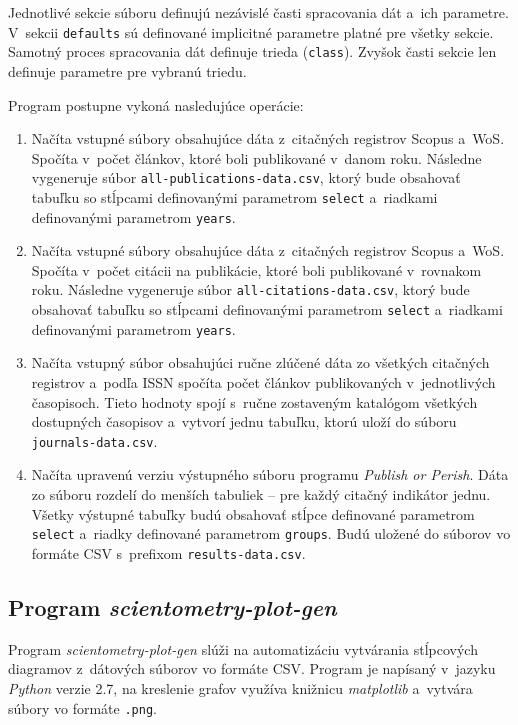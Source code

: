 Jednotlivé sekcie súboru definujú nezávislé časti spracovania dát a~ich
parametre.  V~sekcii \verb|defaults| sú definované implicitné parametre platné
pre všetky sekcie.  Samotný proces spracovania dát definuje trieda
(\verb|class|).  Zvyšok časti sekcie len definuje parametre pre vybranú triedu.

Program postupne vykoná nasledujúce operácie:

\begin{enumerate}
\item Načíta vstupné súbory obsahujúce dáta z~citačných registrov Scopus a~WoS.
  Spočíta v~počet článkov, ktoré boli publikované v~danom roku.  Následne
  vygeneruje súbor \verb|all-publications-data.csv|, ktorý bude obsahovať
  tabuľku so stĺpcami definovanými parametrom \verb|select| a~riadkami
  definovanými parametrom \verb|years|.
\item Načíta vstupné súbory obsahujúce dáta z~citačných registrov Scopus a~WoS.
  Spočíta v~počet citácii na publikácie, ktoré boli publikované v~rovnakom roku.
  Následne vygeneruje súbor \verb|all-citations-data.csv|, ktorý bude obsahovať
  tabuľku so stĺpcami definovanými parametrom \verb|select| a~riadkami
  definovanými parametrom \verb|years|.
\item Načíta vstupný súbor obsahujúci ručne zlúčené dáta zo všetkých citačných
  registrov a~podľa ISSN spočíta počet článkov publikovaných v~jednotlivých
  časopisoch.  Tieto hodnoty spojí s~ručne zostaveným katalógom všetkých
  dostupných časopisov a~vytvorí jednu tabuľku, ktorú uloží do súboru
  \verb|journals-data.csv|.
\item Načíta upravenú verziu výstupného súboru programu \emph{Publish or
    Perish}.  Dáta zo súboru rozdelí do menších tabuliek -- pre každý citačný
  indikátor jednu.  Všetky výstupné tabuľky budú obsahovať stĺpce definované
  parametrom \verb|select| a~riadky definované parametrom \verb|groups|.  Budú
  uložené do súborov vo formáte CSV s~prefixom \verb|results-data.csv|.
\end{enumerate}


\subsection*{Program \emph{scientometry-plot-gen}}

Program \emph{scientometry-plot-gen} slúži na automatizáciu vytvárania
stĺpcových diagramov z~dátových súborov vo formáte CSV.  Program je napísaný
v~jazyku \emph{Python} verzie 2.7, na kreslenie grafov využíva knižnicu
\emph{matplotlib} a~vytvára súbory vo formáte \texttt{.png}.

